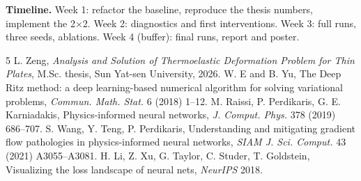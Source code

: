 \documentclass[10pt]{article}
\begin{document}
\textbf{Timeline.} Week 1: refactor the baseline, reproduce the thesis numbers, implement the 2$\times$2. Week 2: diagnostics and first interventions. Week 3: full runs, three seeds, ablations. Week 4 (buffer): final runs, report and poster.

\begin{thebibliography}{5}
\small
\setlength{\itemsep}{0pt}
 L. Zeng, \emph{Analysis and Solution of Thermoelastic Deformation Problem for Thin Plates}, M.Sc. thesis, Sun Yat-sen University, 2026.
 W. E and B. Yu, The Deep Ritz method: a deep learning-based numerical algorithm for solving variational problems, \emph{Commun. Math. Stat.} 6 (2018) 1--12.
 M. Raissi, P. Perdikaris, G. E. Karniadakis, Physics-informed neural networks, \emph{J. Comput. Phys.} 378 (2019) 686--707.
 S. Wang, Y. Teng, P. Perdikaris, Understanding and mitigating gradient flow pathologies in physics-informed neural networks, \emph{SIAM J. Sci. Comput.} 43 (2021) A3055--A3081.
 H. Li, Z. Xu, G. Taylor, C. Studer, T. Goldstein, Visualizing the loss landscape of neural nets, \emph{NeurIPS} 2018.
\end{thebibliography}
\end{document}
